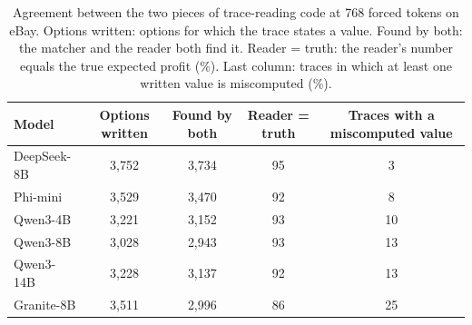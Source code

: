 \begin{table}[h!]
\caption{Agreement between the two pieces of trace-reading code at 768 forced tokens on eBay. Options written: options for which the trace states a value. Found by both: the matcher and the reader both find it. Reader = truth: the reader's number equals the true expected profit (\%). Last column: traces in which at least one written value is miscomputed (\%).}
\label{tab:codecheck}
\footnotesize
\centering

\begin{tabular}{lcccc}
\toprule
Model & Options written & Found by both & Reader = truth & Traces with a miscomputed value \\
\midrule
DeepSeek-8B & 3,752 & 3,734 & 95 & 3 \\
Phi-mini & 3,529 & 3,470 & 92 & 8 \\
Qwen3-4B & 3,221 & 3,152 & 93 & 10 \\
Qwen3-8B & 3,028 & 2,943 & 93 & 13 \\
Qwen3-14B & 3,228 & 3,137 & 92 & 13 \\
Granite-8B & 3,511 & 2,996 & 86 & 25 \\
\bottomrule
\end{tabular}
\end{table}
